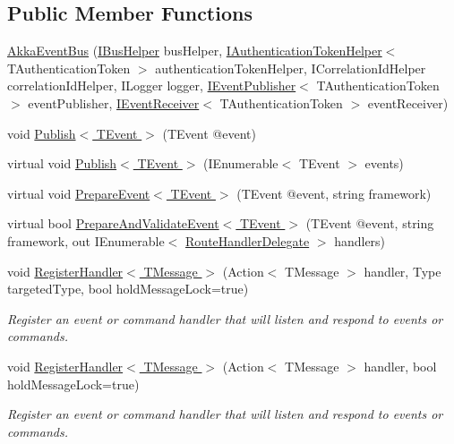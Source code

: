 \subsection*{Public Member Functions}
\begin{DoxyCompactItemize}
\item 
\hyperlink{classCqrs_1_1Akka_1_1Events_1_1AkkaEventBus_ab1f292c21b5516a89fdcc019deb04063}{Akka\+Event\+Bus} (\hyperlink{interfaceCqrs_1_1Bus_1_1IBusHelper}{I\+Bus\+Helper} bus\+Helper, \hyperlink{interfaceCqrs_1_1Authentication_1_1IAuthenticationTokenHelper}{I\+Authentication\+Token\+Helper}$<$ T\+Authentication\+Token $>$ authentication\+Token\+Helper, I\+Correlation\+Id\+Helper correlation\+Id\+Helper, I\+Logger logger, \hyperlink{interfaceCqrs_1_1Events_1_1IEventPublisher}{I\+Event\+Publisher}$<$ T\+Authentication\+Token $>$ event\+Publisher, \hyperlink{interfaceCqrs_1_1Events_1_1IEventReceiver}{I\+Event\+Receiver}$<$ T\+Authentication\+Token $>$ event\+Receiver)
\item 
void \hyperlink{classCqrs_1_1Akka_1_1Events_1_1AkkaEventBus_aaba5d37020e21d03cc2bbc3da14f45ea}{Publish$<$ T\+Event $>$} (T\+Event @event)
\item 
virtual void \hyperlink{classCqrs_1_1Akka_1_1Events_1_1AkkaEventBus_ad5b996dd77efbf51a2b5a32f94417772}{Publish$<$ T\+Event $>$} (I\+Enumerable$<$ T\+Event $>$ events)
\item 
virtual void \hyperlink{classCqrs_1_1Akka_1_1Events_1_1AkkaEventBus_ae9d248ec73204a7909c04e5a87bfeefb}{Prepare\+Event$<$ T\+Event $>$} (T\+Event @event, string framework)
\item 
virtual bool \hyperlink{classCqrs_1_1Akka_1_1Events_1_1AkkaEventBus_a1a89590afc6970f00fe055961a6773e8}{Prepare\+And\+Validate\+Event$<$ T\+Event $>$} (T\+Event @event, string framework, out I\+Enumerable$<$ \hyperlink{classCqrs_1_1Bus_1_1RouteHandlerDelegate}{Route\+Handler\+Delegate} $>$ handlers)
\item 
void \hyperlink{classCqrs_1_1Akka_1_1Events_1_1AkkaEventBus_a59ec3e497e511b73b5239eee80691443}{Register\+Handler$<$ T\+Message $>$} (Action$<$ T\+Message $>$ handler, Type targeted\+Type, bool hold\+Message\+Lock=true)
\begin{DoxyCompactList}\small\item\em Register an event or command handler that will listen and respond to events or commands. \end{DoxyCompactList}\item 
void \hyperlink{classCqrs_1_1Akka_1_1Events_1_1AkkaEventBus_a6795dfcaf611ce1b50310f442cef0546}{Register\+Handler$<$ T\+Message $>$} (Action$<$ T\+Message $>$ handler, bool hold\+Message\+Lock=true)
\begin{DoxyCompactList}\small\item\em Register an event or command handler that will listen and respond to events or commands. \end{DoxyCompactList}\end{DoxyCompactItemize}
